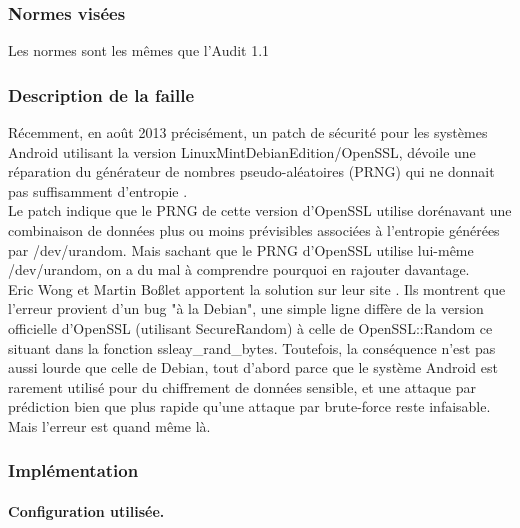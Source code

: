 		\subsubsection{Normes visées}
	
			Les normes sont les mêmes que l'Audit 1.1
		
		\subsubsection{Description de la faille}
		
			Récemment, en août 2013 précisément, un patch de sécurité pour les 
			systèmes Android utilisant la version LinuxMintDebianEdition/OpenSSL, 
			dévoile une réparation du générateur de nombres pseudo-aléatoires (PRNG) 
			qui ne donnait pas suffisamment d'entropie
			\cite{alex2013android} \cite{bochum2013randomly}. \\
			
			Le patch indique que le PRNG de cette version d'OpenSSL utilise dorénavant 
			une combinaison de données plus ou moins prévisibles associées à 
			l'entropie générées par /dev/urandom. Mais sachant que le PRNG d'OpenSSL utilise lui-même /dev/urandom, on a du 
			mal à comprendre pourquoi en rajouter davantage.\\
		
			Eric Wong et Martin Boßlet apportent la solution sur leur site
			\cite{boblet2013android}. Ils montrent que l'erreur 
			provient d'un bug "à la Debian", une simple ligne diffère de la version 
			officielle d'OpenSSL (utilisant SecureRandom) à celle de OpenSSL::Random 
			ce situant dans la fonction ssleay\_rand\_bytes. Toutefois, la conséquence n'est pas aussi lourde que celle de Debian, tout d'abord 
			parce que le système Android est rarement utilisé pour du 
			chiffrement de données sensible, et une attaque par prédiction bien que
			plus rapide qu'une attaque par brute-force reste infaisable. 
			Mais l'erreur est quand même là. \\
	
		
		\subsubsection{Implémentation}
			
			\paragraph{Configuration utilisée.\\}

